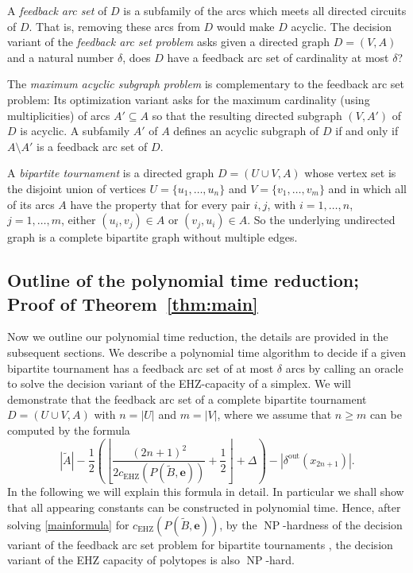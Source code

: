 \documentclass{amsart}
\DeclareMathOperator{\NP}{NP}
\newcommand{\cEHZ}{c_{\mathrm{EHZ}}}
\newcommand{\deltaout}{\delta^{\mathrm{out}}}
\begin{document}
\smallskip

A \emph{feedback arc set} of $D$ is a subfamily of the arcs which
meets all directed circuits of $D$.  That is, removing these arcs from
$D$ would make $D$ acyclic.  The decision variant of the
\emph{feedback arc set problem} asks given a directed graph
$D = (V, A)$ and a natural number $\delta$, does $D$ have a feedback
arc set of cardinality at most $\delta$?

\smallskip

The \emph{maximum acyclic subgraph problem} is complementary to the
feedback arc set problem: Its optimization variant asks for the
maximum cardinality (using multiplicities) of arcs $A' \subseteq A$ so
that the resulting directed subgraph $(V, A')$ of $D$ is acyclic. A
subfamily $A'$ of $A$ defines an acyclic subgraph of $D$ if and only
if $A \setminus A'$ is a feedback arc set of $D$.

\smallskip

A \emph{bipartite tournament} is a directed graph $D = (U \cup V, A)$
whose vertex set is the disjoint union of vertices
$U = \{u_1, \ldots, u_n\}$ and $V = \{v_1, \ldots, v_m\}$ and in which
all of its arcs $A$ have the property that for every pair $i, j$, with
$i = 1, \ldots, n$, $j = 1, \ldots, m$, either $(u_i,v_j) \in A$ or
$(v_j,u_i) \in A$. So the underlying undirected graph is a complete
bipartite graph without multiple edges.

%

\subsection{Outline of the polynomial time reduction; Proof of
  Theorem~\ref{thm:main}}

Now we outline our polynomial time reduction, the details are provided
in the subsequent sections. We describe a polynomial time algorithm to
decide if a given bipartite tournament has a feedback arc set of at
most $\delta$ arcs by calling an oracle to solve the decision variant
of the EHZ-capacity of a simplex.  We will demonstrate that the feedback 
arc set of a complete bipartite tournament $D = (U \cup V, A)$ with $n = |U|$ and $m = |V|$, where we
assume that $n \geq m$ can be computed by the formula
\begin{equation}\label{mainformula}
|\tilde{A}|
- \frac{1}{2}
\left(\left\lfloor\frac{(2n+1)^2}
{2\cEHZ(P(\tilde{B},\textbf{e}))} + \frac{1}{2}
\right\rfloor+\Delta\right)-|\deltaout(x_{2n+1})|.
\end{equation} 
In the following we will explain this formula in detail. In particular we shall show that 
all appearing constants can be constructed in polynomial time. Hence, 
after solving \eqref{mainformula} for $\cEHZ(P(\tilde{B},\textbf{e}))$,
by the $\NP$-hardness of the
decision variant of the feedback arc set problem for bipartite
tournaments \cite{Guo-Hueffner-Moser-2007}, the decision variant of
the EHZ capacity of polytopes is also $\NP$-hard.
\end{document}
